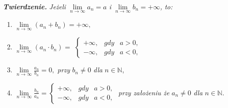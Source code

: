 \documentclass[a4paper,12pt]{article}
\begin{document}
 
	\textbf{\textsl{Twierdzenie.}} \textit{Jeżeli} $ \lim\limits_{n \to \infty} a_n = a $ \textit{i} $ \lim\limits_{n \to \infty} b_n = +\infty$\textit{, to:}
	\begin{enumerate}[label={\arabic*°}]		
		\item $\lim\limits_{n \to \infty}(a_n + b_n) = +\infty,$
		\item $\lim\limits_{n \to \infty}(a_n \cdot b_n) = $
	$\left \{	
	\begin{array}{ccc}
	+\infty, & gdy & a>0,\\
	-\infty, & gdy & a<0,
	\end{array}
		\right .
	$
	\item $\lim\limits_{n \to \infty}\frac{a_n}{b_n} = 0, $ \textit{przy } $b_n \neq 0 $ \textit{dla} $ n \in \mathbb{N}$,
	\item $	\lim\limits_{n \to \infty}\frac{b_n}{a_n} = 
	\left \{	
	\begin{array}{ccc}
		+\infty, & gdy & a>0,\\
		-\infty, & gdy & a<0,
	\end{array}
	\right .$ \textit{przy założeniu że }$a_n \neq 0 $ \textit{dla} $ n \in \mathbb{N}.$
\end{enumerate}
\end{document}
